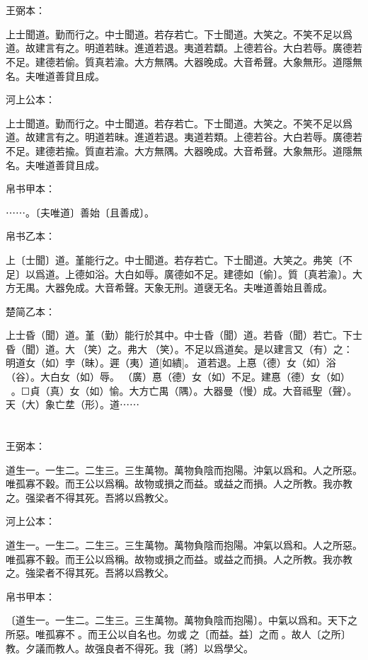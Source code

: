 \documentclass[a5paper]{ctexbook}
\begin{document}
    \chapter{}
    王弼本：

    上士聞道。勤而行之。中士聞道。若存若亡。下士聞道。大笑之。不笑不足以爲道。故建言有之。明道若昧。進道若退。夷道若纇。上德若谷。大白若辱。廣德若不足。建德若偷。質真若渝。大方無隅。大器晚成。大音希聲。大象無形。道隱無名。夫唯道善貸且成。

    河上公本：

    上士聞道。勤而行之。中士聞道。若存若亡。下士聞道。大笑之。不笑不足以爲道。故建言有之。明道若昧。進道若退。夷道若類。上德若谷。大白若辱。廣德若不足。建德若揄。質直若渝。大方無隅。大器晚成。大音希聲。大象無形。道隱無名。夫唯道善貸且成。

    帛书甲本：

    ⋯⋯。〔夫唯道〕善始〔且善成〕。

    帛书乙本：

    上〔士聞〕道。堇能行之。中士聞道。若存若亡。下士聞道。大笑之。弗笑〔不足〕以爲道。上德如浴。大白如辱。廣德如不足。建德如〔偷〕。質〔真若渝〕。大方无禺。大器免成。大音希聲。天象无刑。道襃无名。夫唯道善始且善成。

    楚简乙本：

    上士昏（聞）道。堇（勤）能行於其中。中士昏（聞）道。若昏（聞）若亡。下士昏（聞）道。大𦬫（笑）之。弗大𦬫（笑）。不足以爲道矣。是以建言又（有）之：明道女（如）孛（昧）。遲（夷）道[如繢]。☐道若退。上惪（德）女（如）浴（谷）。大白女（如）辱。󼧊（廣）惪（德）女（如）不足。建惪（德）女（如）󲳴☐。☐貞（真）女（如）愉。大方亡禺（隅）。大器曼（慢）成。大音祗聖（聲）。天（大）象亡坓（形）。道⋯⋯

    \chapter{}
    王弼本：

    道生一。一生二。二生三。三生萬物。萬物負陰而抱陽。沖氣以爲和。人之所惡。唯孤寡不穀。而王公以爲稱。故物或損之而益。或益之而損。人之所教。我亦教之。强梁者不得其死。吾將以爲教父。

    河上公本：

    道生一。一生二。二生三。三生萬物。萬物負陰而抱陽。冲氣以爲和。人之所惡。唯孤寡不轂。而王公以爲稱。故物或損之而益。或益之而損。人之所教。我亦教之。強梁者不得其死。吾將以爲教父。

    帛书甲本：

    〔道生一。一生二。二生三。三生萬物。萬物負陰而抱陽〕。中氣以爲和。天下之所惡。唯孤寡不𥞤。而王公以自名也。勿或𢿃之〔而益。益〕之而𢿃。故人〔之所〕教。夕議而教人。故强良者不得死。我〔將〕以爲學父。
\end{document}
